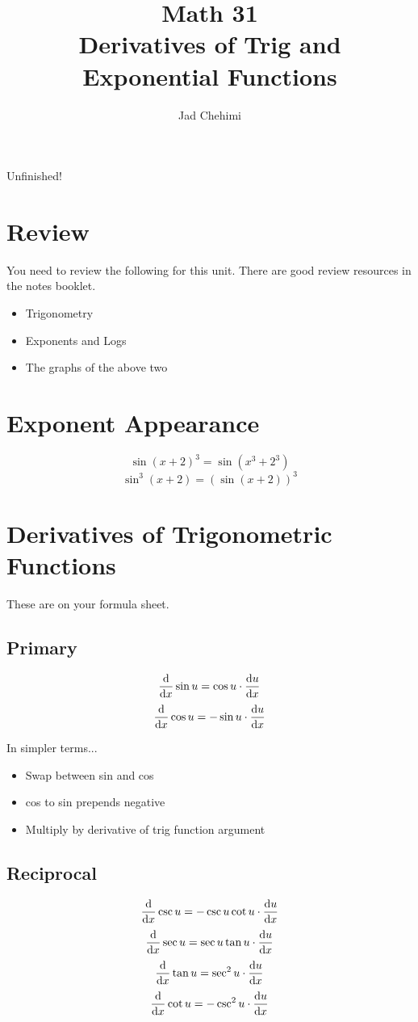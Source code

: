 \documentclass[a4paper,12pt]{article}
\title{Math 31 \\ Derivatives of Trig and Exponential Functions}
\author{Jad Chehimi}
\begin{document}
\maketitle

\begin{center}
\Huge
Unfinished!
\normalsize
\end{center}

\tableofcontents

\pagebreak

\section{Review}
You need to review the following for this unit. There are good review resources in the notes booklet.

\begin{itemize}
    \item{Trigonometry}
    \item{Exponents and Logs}
    \item{The graphs of the above two}
\end{itemize}

\section{Exponent Appearance}
$$\sin{(x + 2)^3} = \sin{(x^3 + 2^3)}$$
$$\sin^3{(x + 2)} = (\sin{(x + 2)})^3$$

\section{Derivatives of Trigonometric Functions}
These are on your formula sheet.

\subsection{Primary}
$$\dv{}{x} \sin{u} = \cos{u} \cdot \dv{u}{x}$$
$$\dv{}{x} \cos{u} = -\sin{u} \cdot \dv{u}{x}$$

In simpler terms...
\begin{itemize}
    \item{Swap between sin and cos}
    \item{cos to sin prepends negative}
    \item{Multiply by derivative of trig function argument}
\end{itemize}

\subsection{Reciprocal}
$$\dv{}{x} \csc{u} = -\csc{u}\cot{u} \cdot \dv{u}{x}$$
$$\dv{}{x} \sec{u} = \sec{u}\tan{u} \cdot \dv{u}{x}$$
$$\dv{}{x} \tan{u} = \sec^2{u} \cdot \dv{u}{x}$$
$$\dv{}{x} \cot{u} = -\csc^2{u} \cdot \dv{u}{x}$$
\end{document}
